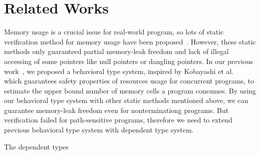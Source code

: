 \section{Related Works}\label{sec:relatedwork}

Memory usage is a crucial issue for real-world program, so lots of
static verification method for memory usage have been
proposed~\cite{DBLP:conf/aplas/SuenagaK09,DBLP:conf/pldi/HeineL03,DBLP:conf/sigsoft/XieA05,DBLP:journals/scp/SwamyHMGJ06,DBLP:conf/sas/OrlovichR06,DBLP:conf/issta/SuiYX12}. However,
these static methods only guaranteed partial memory-leak freedom and
lack of illegal accessing of some pointers like null pointers or
dangling pointers.  In our previous work~\cite{}, we proposed a
behavioral type system, inspired by Kobayashi et
al.~\cite{DBLP:journals/lmcs/KobayashiSW06} which guarantees safety
properties of resources usage for concurrent programs, to estimate the
upper bound number of memory cells a program consumes.  By using our
behavioral type system with other static methods mentioned above, we
can guarantee memory-leak freedom even for nonterminationg
programs. But verification failed for path-sensitive programs,
therefore we need to extend previous behavioral type system with
dependent type system.

The dependent types~\cite{DBLP:conf/popl/XiP99,DBLP:conf/pldi/XiP98} 
